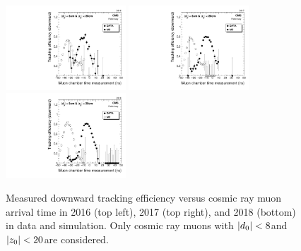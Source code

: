 \begin{figure}[hbtp]
\centering
\includegraphics[width=0.4\textwidth]{figures/tracking_eff/2016/Eff0vsMuon2Time.pdf}
\includegraphics[width=0.4\textwidth]{figures/tracking_eff/2017/Eff0vsMuon2Time.pdf}
\includegraphics[width=0.4\textwidth]{figures/tracking_eff/2018/Eff0vsMuon2Time.pdf}
\caption{Measured downward tracking efficiency versus cosmic ray muon arrival time in 2016 (top left), 2017 (top right), and 2018 (bottom) in data and simulation. Only cosmic ray muons with $\lvert d_0 \rvert<8$\cm and $\lvert z_0 \rvert<20$\cm are considered.}
\label{trk_eff_vs_arrival_time}
\end{figure}